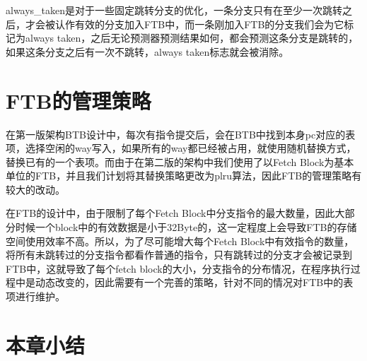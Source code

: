 always\_taken是对于一些固定跳转分支的优化，一条分支只有在至少一次跳转之后，才会被认作有效的分支加入FTB中，而一条刚加入FTB的分支我们会为它标记为always taken，之后无论预测器预测结果如何，都会预测这条分支是跳转的，如果这条分支之后有一次不跳转，always taken标志就会被消除。

\section{FTB的管理策略}

在第一版架构BTB设计中，每次有指令提交后，会在BTB中找到本身pc对应的表项，选择空闲的way写入，如果所有的way都已经被占用，就使用随机替换方式，替换已有的一个表项。而由于在第二版的架构中我们使用了以Fetch Block为基本单位的FTB，并且我们计划将其替换策略更改为plru算法，因此FTB的管理策略有较大的改动。

在FTB的设计中，由于限制了每个Fetch Block中分支指令的最大数量，因此大部分时候一个block中的有效数据是小于32Byte的，这一定程度上会导致FTB的存储空间使用效率不高。所以，为了尽可能增大每个Fetch Block中有效指令的数量，将所有未跳转过的分支指令都看作普通的指令，只有跳转过的分支才会被记录到FTB中，这就导致了每个fetch block的大小，分支指令的分布情况，在程序执行过程中是动态改变的，因此需要有一个完善的策略，针对不同的情况对FTB中的表项进行维护。



\section{本章小结}

